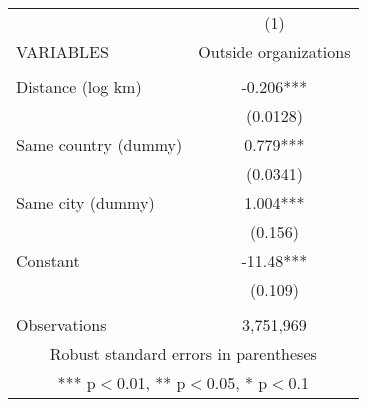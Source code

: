 \begin{tabular}{lc} \hline
 & (1) \\
VARIABLES & Outside organizations \\ \hline
 &  \\
Distance (log km) & -0.206*** \\
 & (0.0128) \\
Same country (dummy) & 0.779*** \\
 & (0.0341) \\
Same city (dummy) & 1.004*** \\
 & (0.156) \\
Constant & -11.48*** \\
 & (0.109) \\
 &  \\
 Observations & 3,751,969 \\ \hline
\multicolumn{2}{c}{ Robust standard errors in parentheses} \\
\multicolumn{2}{c}{ *** p$<$0.01, ** p$<$0.05, * p$<$0.1} \\
\end{tabular}

